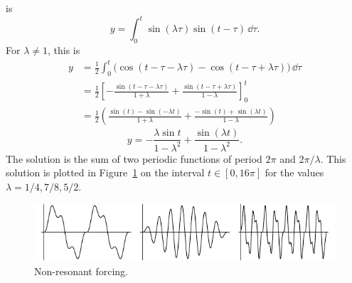 {\begin{Solution}
\begin{enumerate}
\[    \]
    is
    \[
    y = \int_0^t \sin(\lambda \tau) \sin (t-\tau) \,\dd \tau.
    \]
    For $\lambda \neq 1$, this is
    \begin{align*}
      y &= \frac{1}{2} \int_0^t \big( \cos(t - \tau - \lambda \tau)
      - \cos(t - \tau + \lambda \tau) \big) \,\dd \tau \\
      &= \frac{1}{2} \left[
        - \frac{ \sin(t - \tau - \lambda \tau) }{1 + \lambda}
        + \frac{ \sin(t - \tau + \lambda \tau) }{1 - \lambda}
      \right]_0^t \\
      &= \frac{1}{2} \left(
        \frac{ \sin(t) - \sin(-\lambda t)  }{1 + \lambda}
        + \frac{ - \sin(t) + \sin(\lambda t) }{1 - \lambda}
      \right)
    \end{align*}
    \begin{equation}
      \label{non_res_forcing_soln}
      \boxed{
        y = - \frac{ \lambda \sin t }{ 1 - \lambda^2 }
        + \frac{ \sin(\lambda t) }{ 1 - \lambda^2 }.
        }
    \end{equation}
    The solution is the sum of two periodic functions of period $2\pi$
    and $2 \pi / \lambda$. This solution is plotted in Figure~\ref{non_res_forcing}
    on the interval $t \in [0,16 \pi]$ for the values $\lambda = 1/4, 7/8, 5/2$.
    \begin{figure}[tb!]
      \begin{center}
        \includegraphics[width=\textwidth]{ode/inhomogeneous/non_res_forcing}
      \end{center}
      \caption{Non-resonant forcing.}
      \label{non_res_forcing}
    \end{figure}


\end{enumerate}
\end{Solution}}

